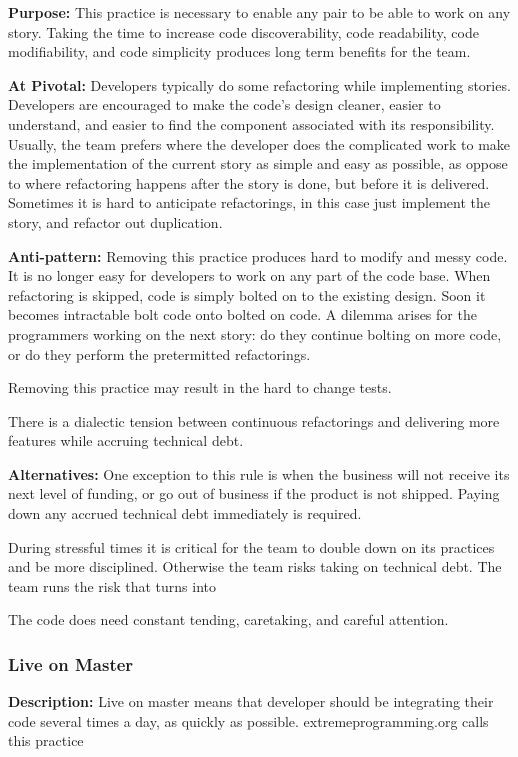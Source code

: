 \begin{table}[]
\textbf{Purpose:} This practice is necessary to enable any pair to be able to work on any story. Taking the time to increase code discoverability, code readability, code modifiability, and code simplicity produces long term benefits for the team. 

\textbf{At Pivotal:} Developers typically do some refactoring while implementing stories. Developers are encouraged to make the code's design cleaner, easier to understand, and easier to find the component associated with its responsibility. Usually, the team prefers  where the developer does the complicated work to make the implementation of the current story as simple and easy as possible, as oppose to  where refactoring happens after the story is done, but before it is delivered.  Sometimes it is hard to anticipate refactorings, in this case just implement the story, and refactor out duplication. 

\textbf{Anti-pattern:}  Removing this practice produces hard to modify and messy code. It is no longer easy for developers to work on any part of the code base. When refactoring is skipped, code is simply bolted on to the existing design. Soon it becomes intractable bolt code onto bolted on code. A dilemma arises for the programmers working on the next story: do they continue bolting on more code, or do they perform the pretermitted refactorings.

Removing this practice may result in the hard to change tests.

There is a dialectic tension \cite{RalphProcessTheories} between continuous refactorings and delivering more features while accruing technical debt. 

\textbf{Alternatives:} One exception to this rule is when the business will not receive its next level of funding, or go out of business if the product is not shipped. Paying down any accrued technical debt immediately is required. 

During stressful times it is critical for the team to double down on its practices and be more disciplined. Otherwise the team risks taking on technical debt. The team runs the risk that  turns into 

The code does need constant tending, caretaking, and careful attention.

\subsubsection{Live on Master}
\textbf{Description:} Live on master means that developer should be integrating their code several times a day, as quickly as possible. extremeprogramming.org calls this practice  \cite{IntegrateOften} 


\end{table}

